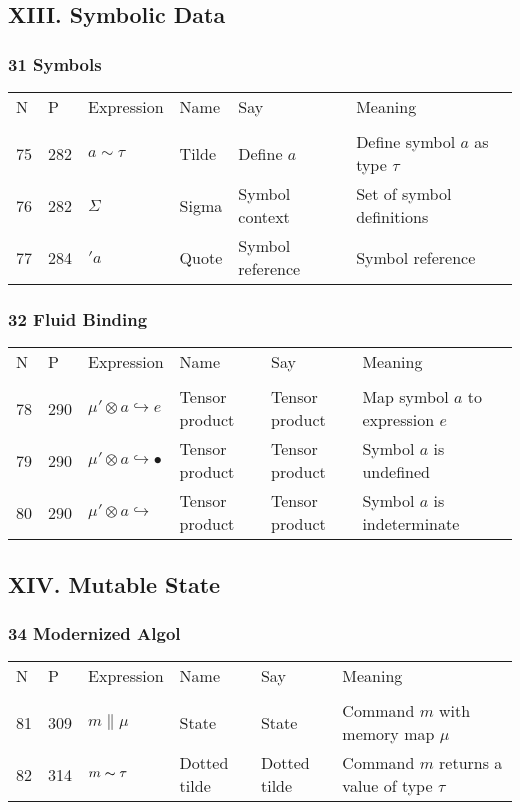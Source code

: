 \documentclass[12pt]{article}
\begin{document}
\subsection*{XIII. Symbolic Data}
\subsubsection*{31 Symbols}
\begin{tabular}[b] {p{} p{} p{} p{} 
p{} p{}}
N & P & Expression & Name & Say & Meaning \\ \\

75 & 282 & $a \sim \tau$ & Tilde & Define $a$ & Define symbol $a$ as type $\tau$ \\
76 & 282 & $\Sigma$ & Sigma & Symbol context & Set of symbol definitions \\
77 & 284 & $'a$ & Quote & Symbol reference & Symbol reference \\
\end{tabular}

\subsubsection*{32 Fluid Binding}
\begin{tabular}[b] {p{} p{} p{} p{} 
p{} p{}}
N & P & Expression & Name & Say & Meaning \\ \\
78 & 290 & $\mu ' \otimes a \hookrightarrow e$ & Tensor product & Tensor product &  Map symbol $a$ to expression $e$\\
79 & 290 & $\mu ' \otimes a \hookrightarrow \bullet$ & Tensor product & Tensor product &  Symbol $a$ is undefined\\
80 & 290 & $\mu ' \otimes a \hookrightarrow $ \underline{ } & Tensor product & Tensor product &  Symbol $a$ is indeterminate\\

\end{tabular}

\subsection*{XIV. Mutable State}
\subsubsection*{34 Modernized Algol}
\begin{tabular}[b] {p{} p{} p{} p{} 
p{} p{}}
N & P & Expression & Name & Say & Meaning \\ \\

81 & 309 & $ m \| \mu $& State & State & Command $m$ with memory map $\mu$\\
82 & 314 & $ m \thicksim \tau$ & Dotted tilde & Dotted tilde & Command $m$ returns a value of type $\tau$\\
\end{tabular}
\end{document}

